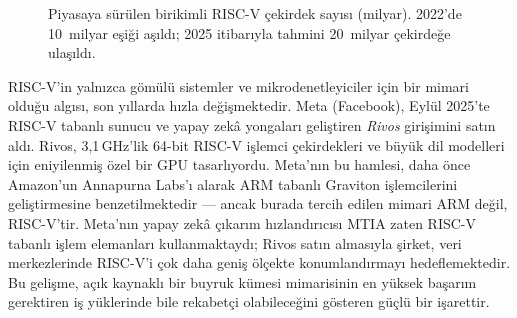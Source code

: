 \begin{figure}[H]
\centering
{}
\caption[RISC-V çekirdek sayısının yıllara göre büyümesi]{Piyasaya sürülen birikimli RISC-V çekirdek sayısı (milyar). 2022'de 10~milyar eşiği aşıldı; 2025 itibarıyla tahmini 20~milyar çekirdeğe ulaşıldı.}
\label{fig:riscv-buyume}
\end{figure}

\begin{bilginot}
RISC-V'in yalnızca gömülü sistemler ve mikrodenetleyiciler için bir mimari olduğu algısı, son yıllarda hızla değişmektedir. Meta (Facebook), Eylül 2025'te RISC-V tabanlı sunucu ve yapay zekâ yongaları geliştiren \emph{Rivos} girişimini satın aldı. Rivos, 3{,}1\,GHz'lik 64-bit RISC-V işlemci çekirdekleri ve büyük dil modelleri için eniyilenmiş özel bir GPU tasarlıyordu. Meta'nın bu hamlesi, daha önce Amazon'un Annapurna Labs'ı alarak ARM tabanlı Graviton işlemcilerini geliştirmesine benzetilmektedir --- ancak burada tercih edilen mimari ARM değil, RISC-V'tir. Meta'nın yapay zekâ çıkarım hızlandırıcısı MTIA zaten RISC-V tabanlı işlem elemanları kullanmaktaydı; Rivos satın almasıyla şirket, veri merkezlerinde RISC-V'i çok daha geniş ölçekte konumlandırmayı hedeflemektedir. Bu gelişme, açık kaynaklı bir buyruk kümesi mimarisinin en yüksek başarım gerektiren iş yüklerinde bile rekabetçi olabileceğini gösteren güçlü bir işarettir.
\end{bilginot}

